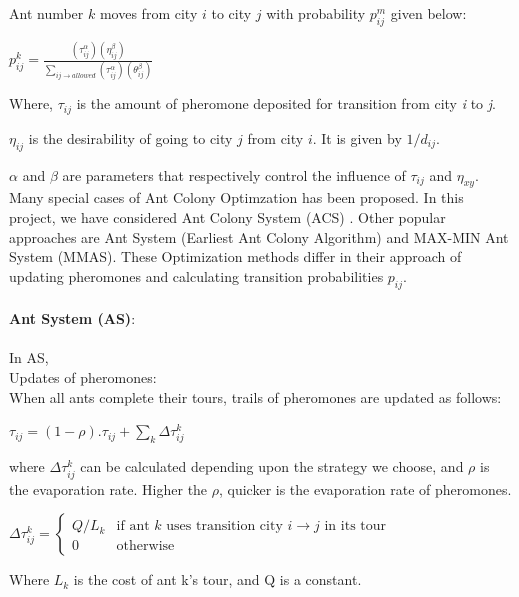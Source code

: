 \documentclass[14pt, english]{article}
\begin{document}
\noindent
Ant number $k$ moves from city $i$ to city $j$ with probability $p_{ij}^m$ given below:

\begin{center}
$p_{ij}^k = \frac{{(\tau_{ij}^\alpha)(\eta_{ij}^\beta)}}{\sum_{ij \rightarrow allowed}{(\tau_{ij}^\alpha)(\theta_{ij}^\beta)}}$
\end{center}
\noindent
Where, $\tau_{ij}$ is the amount of pheromone deposited for transition from city \emph{i} to \emph{j}.

\tab  $\eta _{ij}$ is the desirability of going to city ${j}$ from city ${i}$. It is given by ${1/d_{ij}}$.

\tab $\alpha$ and $\beta$ are parameters that respectively control the influence of $\tau_{ij}$ and $\eta _{xy}$.\\

\noindent
Many special cases of Ant Colony Optimzation has been proposed. In this project, we have considered Ant Colony System (ACS) \cite{Dorigo1997}. Other popular approaches are Ant System (Earliest Ant Colony Algorithm)\cite{Dorigo06antcolony} and MAX-MIN Ant System (MMAS)\cite{Sttzle1998}. These Optimization methods differ in their approach of updating pheromones and calculating transition probabilities $p_{ij}$. \\
\\
\noindent
{\bf Ant System (AS)}:\\
\\
In AS,\\
\noindent
Updates of pheromones:\\ 
When all ants complete their tours, trails of pheromones are updated as follows:

\begin{center}
$\tau_{ij} = (1-\rho).\tau_{ij} + \sum_{k}\Delta \tau_{ij}^k$
\end{center}
where $\Delta \tau_{ij}^k$ can be calculated depending upon the strategy we choose, and $\rho$ is the evaporation rate. Higher the $\rho$, quicker is the evaporation rate of pheromones.\\
\begin{center}
$\Delta \tau _{ij}^{k}={\begin{cases}Q/L_{k}&{\mbox{if ant }}k{\mbox{ uses transition city }}i \rightarrow j{\mbox{ in its tour}}\\0&{\mbox{otherwise}}\end{cases}}$\\
\end{center}
\noindent
Where $L_{k}$ is the cost of ant k's tour, and Q is a constant.\\
\end{document}
